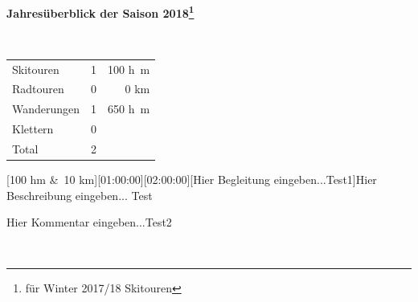 \begin{center}{\Large \textbf{ Jahres\"uberblick der Saison 2018\footnote{f\"ur Winter 2017/18  Skitouren}}} 

~

\begin{tabular}{lrr}
Skitouren & 1 & 100 \si{h\meter}\\
Radtouren& 0 & 0 \si{\kilo\meter}\\
Wanderungen& 1 & 650 \si{h\meter}\\
Klettern& 0&\\\hline
Total& 2 &
\end{tabular}\end{center}\newpage 
\begin{minipage}{\textwidth}[100 hm \&~10 km][01:00:00][02:00:00][Hier Begleitung eingeben...Test1]\label{2018-06-08-Test}Hier Beschreibung eingeben... Test


 Hier Kommentar eingeben...Test2
\end{minipage}\vspace{2em} ~\newline 

